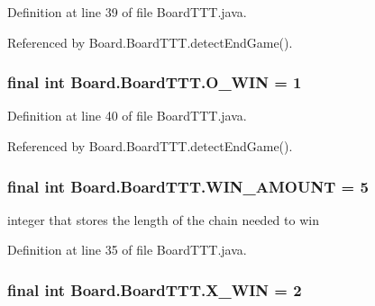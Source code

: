 Definition at line 39 of file Board\+T\+T\+T.\+java.



Referenced by Board.\+Board\+T\+T\+T.\+detect\+End\+Game().

\hypertarget{class_board_1_1_board_t_t_t_a989aacd76a6193fe54a4500dd8151b41}{}
\subsubsection[{O\+\_\+\+W\+I\+N}]{\setlength{\rightskip}{0pt plus 5cm}final int Board.\+Board\+T\+T\+T.\+O\+\_\+\+W\+I\+N = 1\hspace{0.3cm}{\ttfamily [static]}}\label{class_board_1_1_board_t_t_t_a989aacd76a6193fe54a4500dd8151b41}


Definition at line 40 of file Board\+T\+T\+T.\+java.



Referenced by Board.\+Board\+T\+T\+T.\+detect\+End\+Game().

\hypertarget{class_board_1_1_board_t_t_t_ab11d997e2ea0983b566f23c4685767f6}{}
\subsubsection[{W\+I\+N\+\_\+\+A\+M\+O\+U\+N\+T}]{\setlength{\rightskip}{0pt plus 5cm}final int Board.\+Board\+T\+T\+T.\+W\+I\+N\+\_\+\+A\+M\+O\+U\+N\+T = 5\hspace{0.3cm}{\ttfamily [private]}}\label{class_board_1_1_board_t_t_t_ab11d997e2ea0983b566f23c4685767f6}
integer that stores the length of the chain needed to win 

Definition at line 35 of file Board\+T\+T\+T.\+java.

\hypertarget{class_board_1_1_board_t_t_t_ab77ee706643fb1825e78f6b8dcacc021}{}
\subsubsection[{X\+\_\+\+W\+I\+N}]{\setlength{\rightskip}{0pt plus 5cm}final int Board.\+Board\+T\+T\+T.\+X\+\_\+\+W\+I\+N = 2\hspace{0.3cm}{\ttfamily [static]}}\label{class_board_1_1_board_t_t_t_ab77ee706643fb1825e78f6b8dcacc021}


